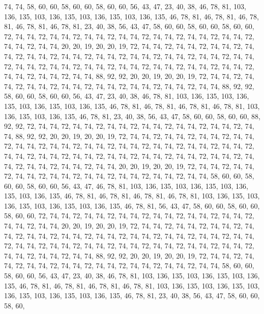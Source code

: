 74, 74, 58, 60, 60, 58, 60, 60, 58, 60, 60, 56, 43, 47, 23, 40, 38, 46, 78, 81, 103, 136, 135, 103, 136, 135, 103, 136, 135, 103, 136, 135, 46, 78, 81, 46, 78, 81, 46, 78, 81, 46, 78, 81, 46, 78, 81, 23, 40, 38, 56, 43, 47, 58, 60, 60, 58, 60, 60, 58, 60, 60, 72, 74,
74, 72, 74, 74, 72, 74, 74, 72, 74, 74, 72, 74, 74, 72, 74, 74, 72, 74, 74, 72, 74, 74, 72, 74, 74, 20, 20, 19, 20, 20, 19, 72, 74, 74, 72, 74, 74, 72, 74, 74, 72, 74, 74, 72, 74, 74, 72, 74, 74, 72, 74, 74, 72, 74, 74, 72, 74, 74, 72, 74, 74, 72, 74, 74,
72, 74, 74, 72, 74, 74, 72, 74, 74, 72, 74, 74, 72, 74, 74, 72, 74, 74, 72, 74, 74, 72, 74, 74, 72, 74, 74, 72, 74, 74, 88, 92, 92, 20, 20, 19, 20, 20, 19, 72, 74, 74, 72, 74, 74, 72, 74, 74, 72, 74, 74, 72, 74, 74, 72, 74, 74, 72, 74, 74, 72, 74, 74, 88,
92, 92, 58, 60, 60, 58, 60, 60, 56, 43, 47, 23, 40, 38, 46, 78, 81, 103, 136, 135, 103, 136, 135, 103, 136, 135, 103, 136, 135, 46, 78, 81, 46, 78, 81, 46, 78, 81, 46, 78, 81, 103, 136, 135, 103, 136, 135, 46, 78, 81, 23, 40, 38, 56, 43, 47, 58, 60, 60, 58, 60, 60, 88, 92,
92, 72, 74, 74, 72, 74, 74, 72, 74, 74, 72, 74, 74, 72, 74, 74, 72, 74, 74, 72, 74, 74, 88, 92, 92, 20, 20, 19, 20, 20, 19, 72, 74, 74, 72, 74, 74, 72, 74, 74, 72, 74, 74, 72, 74, 74, 72, 74, 74, 72, 74, 74, 72, 74, 74, 72, 74, 74, 72, 74, 74, 72, 74, 74,
72, 74, 74, 72, 74, 74, 72, 74, 74, 72, 74, 74, 72, 74, 74, 72, 74, 74, 72, 74, 74, 72, 74, 74, 72, 74, 74, 72, 74, 74, 72, 74, 74, 20, 20, 19, 20, 20, 19, 72, 74, 74, 72, 74, 74, 72, 74, 74, 72, 74, 74, 72, 74, 74, 72, 74, 74, 72, 74, 74, 72, 74, 74, 58,
60, 60, 58, 60, 60, 58, 60, 60, 56, 43, 47, 46, 78, 81, 103, 136, 135, 103, 136, 135, 103, 136, 135, 103, 136, 135, 46, 78, 81, 46, 78, 81, 46, 78, 81, 46, 78, 81, 103, 136, 135, 103, 136, 135, 103, 136, 135, 103, 136, 135, 46, 78, 81, 56, 43, 47, 58, 60, 60, 58, 60, 60, 58, 60,
60, 72, 74, 74, 72, 74, 74, 72, 74, 74, 72, 74, 74, 72, 74, 74, 72, 74, 74, 72, 74, 74, 72, 74, 74, 20, 20, 19, 20, 20, 19, 72, 74, 74, 72, 74, 74, 72, 74, 74, 72, 74, 74, 72, 74, 74, 72, 74, 74, 72, 74, 74, 72, 74, 74, 72, 74, 74, 72, 74, 74, 72, 74, 74,
72, 74, 74, 72, 74, 74, 72, 74, 74, 72, 74, 74, 72, 74, 74, 72, 74, 74, 72, 74, 74, 72, 74, 74, 72, 74, 74, 72, 74, 74, 88, 92, 92, 20, 20, 19, 20, 20, 19, 72, 74, 74, 72, 74, 74, 72, 74, 74, 72, 74, 74, 72, 74, 74, 72, 74, 74, 72, 74, 74, 72, 74, 74, 58,
60, 60, 58, 60, 60, 56, 43, 47, 23, 40, 38, 46, 78, 81, 103, 136, 135, 103, 136, 135, 103, 136, 135, 46, 78, 81, 46, 78, 81, 46, 78, 81, 46, 78, 81, 103, 136, 135, 103, 136, 135, 103, 136, 135, 103, 136, 135, 103, 136, 135, 46, 78, 81, 23, 40, 38, 56, 43, 47, 58, 60, 60, 58, 60,

